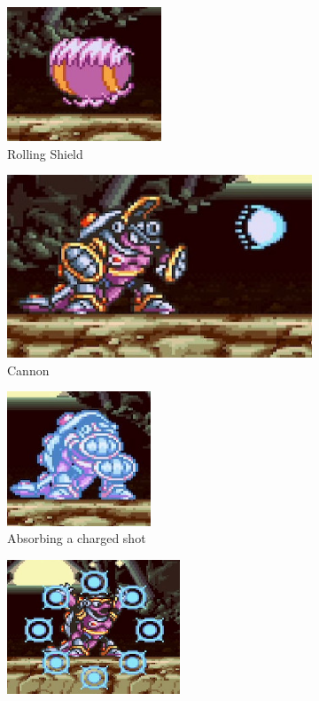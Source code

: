 \begin{figure}[htp]
	\centering
	\begin{subfigure}{0.45\textwidth}
		\centering
		\includegraphics[height=4cm]{figures/X1/Armored_armadillo/Armadillo_rolling.jpg}
		\caption{Rolling Shield}
	\end{subfigure}
	\begin{subfigure}{0.45\textwidth}
		\centering
		\includegraphics[width=\linewidth]{figures/X1/Armored_armadillo/Armadillo_cannon.jpg}
		\caption{Cannon}
	\end{subfigure}	
	\begin{subfigure}{0.45\textwidth}
		\centering
		\includegraphics[height=4cm]{figures/X1/Armored_armadillo/Armadillo_energy_1.jpg}
		\caption{Absorbing a charged shot}
	\end{subfigure}
	\begin{subfigure}{0.45\textwidth}
		\centering
		\includegraphics[height=4cm]{figures/X1/Armored_armadillo/Armadillo_energy_2.jpg}

\end{subfigure}
\end{figure}
